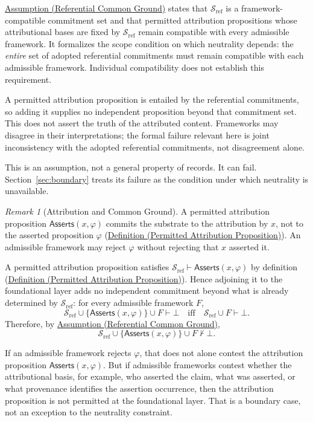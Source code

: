 \documentclass[11pt]{article}
\theoremstyle{plain}
\theoremstyle{definition}
\theoremstyle{remark}
\newtheorem{remark}[theorem]{Remark}
\newcommand{\DefRef}[2]{\hyperref[#1]{Definition (#2)}}
\newcommand{\AssumpRef}[2]{\hyperref[#1]{Assumption (#2)}}
\newcommand{\SecRef}[1]{Section~\ref{#1}}
\newcommand{\SubstrateRef}{\mathcal{S}_{\mathrm{ref}}}
\newcommand{\Framework}{F}
\newcommand{\entails}{\vdash}
\newcommand{\notentails}{\nvdash}
\newcommand{\Asserts}{\mathsf{Asserts}}
\begin{document}
\AssumpRef{se100.assump.ReferentialCommonGround}{Referential Common Ground}
states that $\SubstrateRef$ is a framework-compatible commitment set and
that permitted attribution propositions whose attributional bases are fixed
by $\SubstrateRef$ remain compatible with every admissible framework.
It formalizes the scope condition on which neutrality depends:
the \emph{entire} set of adopted referential commitments must remain
compatible with each admissible framework.
Individual compatibility does not establish this requirement.

A permitted attribution proposition is entailed by the referential
commitments, so adding it supplies no independent proposition beyond
that commitment set. This does not assert the truth of the
attributed content.
Frameworks may disagree in their interpretations; the formal
failure relevant here is joint inconsistency with the adopted
referential commitments, not disagreement alone.

This is an assumption, not a general property of records.
It can fail.
\SecRef{sec:boundary} treats its failure as the condition under which
neutrality is unavailable.

\begin{remark}[Attribution and Common Ground]
  \label{se100.remark.AttributionCommonGround}
  A permitted attribution proposition
  $\Asserts(x,\varphi)$ commits the substrate to the attribution by $x$,
  not to the asserted proposition $\varphi$
  (\DefRef{se100.def.PermittedAttributionProposition}{Permitted Attribution Proposition}).
  An admissible framework may reject $\varphi$ without rejecting that
  $x$ asserted it.

  A permitted attribution proposition satisfies
  $\SubstrateRef \entails \Asserts(x,\varphi)$
  by definition
  (\DefRef{se100.def.PermittedAttributionProposition}{Permitted Attribution Proposition}).
  Hence adjoining it to the foundational layer adds no independent commitment
  beyond what is already determined by $\SubstrateRef$: for every admissible
  framework $\Framework$,
  \[
    \SubstrateRef \cup \{\Asserts(x,\varphi)\} \cup \Framework
    \entails \bot
    \quad\text{iff}\quad
    \SubstrateRef \cup \Framework \entails \bot .
  \]
  Therefore, by
  \AssumpRef{se100.assump.ReferentialCommonGround}{Referential Common Ground},
  \[
    \SubstrateRef \cup \{\Asserts(x,\varphi)\} \cup \Framework
    \notentails \bot .
  \]

  If an admissible framework rejects $\varphi$,
  that does not alone contest the attribution proposition $\Asserts(x,\varphi)$.
  But if admissible frameworks contest whether the attributional basis,
  for example, who asserted the claim, what was
  asserted, or what provenance identifies the assertion occurrence,
  then the attribution proposition is not permitted at the foundational layer.
  That is a boundary case, not an exception to the neutrality constraint.
\end{remark}
\end{document}
